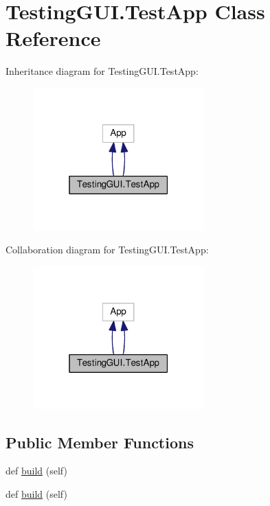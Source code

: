 \hypertarget{classTestingGUI_1_1TestApp}{}\section{Testing\+G\+U\+I.\+Test\+App Class Reference}
\label{classTestingGUI_1_1TestApp}


Inheritance diagram for Testing\+G\+U\+I.\+Test\+App\+:\nopagebreak
\begin{figure}[H]
\begin{center}
\leavevmode
\includegraphics[width=187pt]{classTestingGUI_1_1TestApp__inherit__graph}
\end{center}
\end{figure}


Collaboration diagram for Testing\+G\+U\+I.\+Test\+App\+:\nopagebreak
\begin{figure}[H]
\begin{center}
\leavevmode
\includegraphics[width=187pt]{classTestingGUI_1_1TestApp__coll__graph}
\end{center}
\end{figure}
\subsection*{Public Member Functions}
\begin{DoxyCompactItemize}
\item 
def \hyperlink{classTestingGUI_1_1TestApp_ae400da04ab73e37a37943e36a1a90fd7}{build} (self)
\item 
def \hyperlink{classTestingGUI_1_1TestApp_ae400da04ab73e37a37943e36a1a90fd7}{build} (self)
\end{DoxyCompactItemize}

